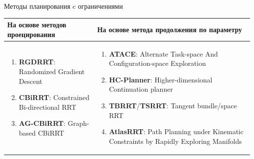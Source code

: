 \documentclass[11pt, aspectratio=169]{beamer}
\begin{document}
\begin{frame}{Методы планирования c ограничениями}
    \begin{table}[ht]
        \begin{tabular}{|p{}|p{}|}
        \hline
        На основе методов проецирования & На основе метода продолжения по параметру\\
        \hline
        \begin{enumerate}
          \item \textbf{RGDRRT}: Randomized Gradient Descent
          \item \textbf{CBiRRT}: Constrained Bi-directional RRT
          \item \textbf{AG-CBiRRT}: Graph-based CBiRRT
        \end{enumerate} & \begin{enumerate}
          \item \textbf{ATACE}: Alternate Task-space And Configuration-space Exploration
          \item \textbf{HC-Planner}: Higher-dimensional Continuation planner
          \item \textbf{TBRRT}/\textbf{TSRRT}: Tangent bundle/space RRT
          \item \textbf{AtlasRRT}: Path Planning under Kinematic Constraints by Rapidly Exploring Manifolds
        \end{enumerate}\\
        \hline
        \end{tabular}
        \label{tab:constr_planning_review}
    \end{table}
\end{frame}
\end{document}
